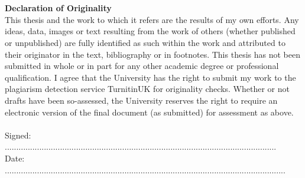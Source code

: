 
\chapter*{}

\vspace{12cm}

{\Large\textbf{Declaration of Originality}}
\\	

This thesis and the work to which it refers are the results of my own efforts. Any ideas, data, images or text resulting from the work of others (whether published or unpublished) are fully identified as such within the work and attributed to their originator in the text, bibliography or in footnotes. This thesis has not been submitted in whole or in part for any other academic degree or professional qualification. I agree that the University has the right to submit my work to the plagiarism detection service TurnitinUK for originality checks. Whether or not drafts have been so-assessed, the University reserves the right to require an electronic version of the final document (as submitted) for assessment as above.
\\
\\

Signed: ...................................................................................................................... 
\\

Date: ..........................................................................................................................
